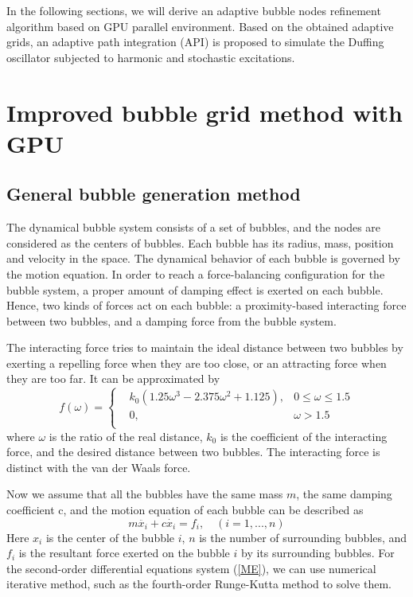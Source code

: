 \documentclass[a4paper, 11pt, final]{article}
\begin{document}
In the following sections, we will derive an adaptive bubble nodes
refinement algorithm based on GPU parallel environment. Based on the
obtained adaptive grids, an adaptive path integration (API) is proposed to
simulate the Duffing oscillator subjected to harmonic and stochastic
excitations.

\section{Improved bubble grid method with GPU}
\subsection{General bubble generation method}
The dynamical bubble system consists of a set of
bubbles, and the nodes are considered as the centers of bubbles. Each bubble has its radius, mass, position and velocity in
the space. The dynamical behavior of each bubble is governed by the
motion equation. In order to reach a force-balancing configuration for the bubble system, a proper amount of damping effect is exerted on each bubble. Hence, two kinds of forces act on
each bubble: a proximity-based interacting force between two
bubbles, and a damping force from the bubble system.

The interacting force tries to maintain the ideal distance between
two bubbles by exerting a repelling force when they are too close,
or an attracting force when they are too far. It can be approximated
by
\begin{equation}
    \label{VDWF}
    f(\omega) = \left\{ \begin{aligned}
        & k_0(1.25\omega^3-2.375\omega^2+1.125), & 0 \leq \omega \leq 1.5 \\
        & 0, & \omega>1.5 \\
    \end{aligned} \right.
\end{equation}
where $\omega$ is the ratio of the real distance, $k_0$ is the coefficient of the interacting force, and the desired distance
between two bubbles. The interacting force is distinct with the van der Waals force.

Now we assume that all the bubbles have the same mass $m$, the same damping coefficient c, and the motion equation of each bubble can be described as
\begin{equation}
    \label{ME}
    m\ddot{x_i}+c\dot{x_i}=f_i,\quad (i=1,...,n)
\end{equation}
Here $x_i$ is the center of the bubble $i$, $n$ is the number of surrounding bubbles, and $f_i$ is the resultant force exerted on the bubble 
$i$ by its surrounding bubbles. For the second-order differential equations system (\ref{ME}), we can
use numerical iterative method, such as the fourth-order Runge-Kutta method to solve them.
\end{document}
